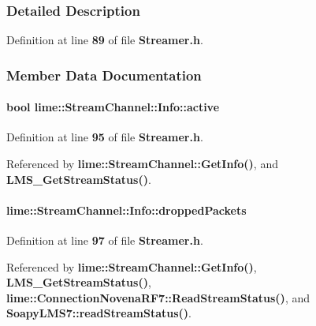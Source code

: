 \subsubsection{Detailed Description}


Definition at line {\bf 89} of file {\bf Streamer.\+h}.



\subsubsection{Member Data Documentation}
\paragraph[{active}]{\setlength{\rightskip}{0pt plus 5cm}bool lime\+::\+Stream\+Channel\+::\+Info\+::active}\label{structlime_1_1StreamChannel_1_1Info_adbda4a1d7b8d723d4f2e734e47de4442}


Definition at line {\bf 95} of file {\bf Streamer.\+h}.



Referenced by {\bf lime\+::\+Stream\+Channel\+::\+Get\+Info()}, and {\bf L\+M\+S\+\_\+\+Get\+Stream\+Status()}.

\paragraph[{dropped\+Packets}]{ lime\+::\+Stream\+Channel\+::\+Info\+::dropped\+Packets}\label{structlime_1_1StreamChannel_1_1Info_abe8d36d5766cc69c70fba2ce7a29cb5f}


Definition at line {\bf 97} of file {\bf Streamer.\+h}.



Referenced by {\bf lime\+::\+Stream\+Channel\+::\+Get\+Info()}, {\bf L\+M\+S\+\_\+\+Get\+Stream\+Status()}, {\bf lime\+::\+Connection\+Novena\+R\+F7\+::\+Read\+Stream\+Status()}, and {\bf Soapy\+L\+M\+S7\+::read\+Stream\+Status()}.

